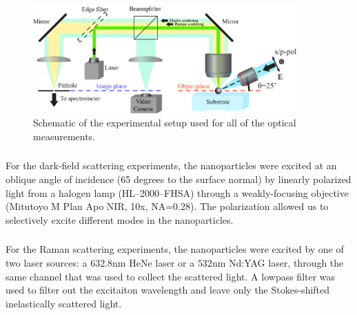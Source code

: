             \begin{figure}[h!]
                    \begin{center}
                        \includegraphics[width=0.9\textwidth]{figs/methods/expSetup2.eps}
                    \end{center}
                    \label{fig:expSetup}
                    \caption{Schematic of the experimental setup used for all of the optical measurements.}
            \end{figure}


        \subsubsection{}
            \label{sec:Darkfield}
                For the dark-field scattering experiments, the nanoparticles were excited at an oblique angle of incidence
            (65 degrees to the surface normal) by linearly polarized light from a halogen lamp (HL--2000--FHSA)
            through a weakly-focusing objective (Mitutoyo M Plan Apo NIR, 10x, NA=0.28). The polarization allowed us to
            selectively excite different modes in the nanoparticles\cite{permyakov2015probing}.

        \subsubsection{}
        \label{sec:Raman}
                For the Raman scattering experiments, the nanoparticles were excited by one of two laser sources: a $632.8$nm HeNe laser
            or a $532$nm Nd:YAG laser, through the same channel that was used to collect the scattered light. A lowpass filter was used
            to filter out the excitaiton wavelength and leave only the Stokes-shifted inelastically scattered light.

